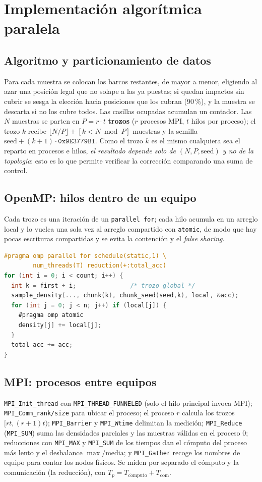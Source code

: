 \documentclass[conference]{IEEEtran}
\begin{document}
\section{Implementaci\'on algor\'itmica paralela}
\subsection{Algoritmo y particionamiento de datos}
Para cada muestra se colocan los barcos restantes, de mayor a menor, eligiendo al azar una posici\'on legal que no solape a las ya puestas; si quedan impactos sin cubrir se sesga la elecci\'on hacia posiciones que los cubran (90\,\%), y la muestra se descarta si no los cubre todos. Las casillas ocupadas acumulan un contador. Las $N$ muestras se parten en $P=r\cdot t$ \textbf{trozos} ($r$ procesos MPI, $t$ hilos por proceso); el trozo $k$ recibe $\lfloor N/P\rfloor+[k<N\bmod P]$ muestras y la semilla $\mathrm{seed}+(k+1)\cdot\texttt{0x9E3779B1}$. Como el trozo $k$ es el mismo cualquiera sea el reparto en procesos e hilos, \emph{el resultado depende solo de $(N,P,\mathrm{seed})$ y no de la topolog\'ia}: esto es lo que permite verificar la correcci\'on comparando una suma de control.

\subsection{OpenMP: hilos dentro de un equipo}
Cada trozo es una iteraci\'on de un \texttt{parallel for}; cada hilo acumula en un arreglo local y lo vuelca una sola vez al arreglo compartido con \texttt{atomic}, de modo que hay pocas escrituras compartidas y se evita la contenci\'on y el \emph{false sharing}.
\begin{lstlisting}[language=C]
#pragma omp parallel for schedule(static,1) \
        num_threads(T) reduction(+:total_acc)
for (int i = 0; i < count; i++) {
  int k = first + i;               /* trozo global */
  sample_density(..., chunk(k), chunk_seed(seed,k), local, &acc);
  for (int j = 0; j < n; j++) if (local[j]) {
    #pragma omp atomic
    density[j] += local[j];
  }
  total_acc += acc;
}
\end{lstlisting}

\subsection{MPI: procesos entre equipos}
\texttt{MPI\_Init\_thread} con \texttt{MPI\_THREAD\_FUNNELED} (solo el hilo principal invoca MPI); \texttt{MPI\_Comm\_rank/size} para ubicar el proceso; el proceso $r$ calcula los trozos $[rt,(r+1)t)$; \texttt{MPI\_Barrier} y \texttt{MPI\_Wtime} delimitan la medici\'on; \texttt{MPI\_Reduce} (\texttt{MPI\_SUM}) suma las densidades parciales y las muestras v\'alidas en el proceso 0; reducciones con \texttt{MPI\_MAX} y \texttt{MPI\_SUM} de los tiempos dan el c\'omputo del proceso m\'as lento y el desbalance $\max/\mathrm{media}$; y \texttt{MPI\_Gather} recoge los nombres de equipo para contar los nodos f\'isicos. Se miden por separado el c\'omputo y la comunicaci\'on (la reducci\'on), con $T_p=T_{\mathrm{c\acute{o}mputo}}+T_{\mathrm{com}}$.
\end{document}
